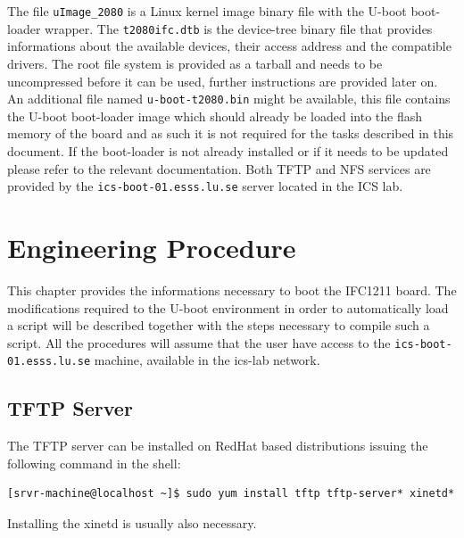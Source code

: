 \documentclass[11pt
  , a4paper
  , article
  , oneside
  , showtrims
]{memoir}
\begin{document}
The file \texttt{uImage\_2080} is a Linux kernel image binary file with the U-boot boot-loader wrapper. The \texttt{t2080ifc.dtb} is the device-tree binary file that provides informations about the available devices, their access address and the compatible drivers.
The root file system is provided as a tarball and needs to be uncompressed before it can be used, further instructions are provided later on.
An additional file named \texttt{u-boot-t2080.bin} might be available, this file contains the U-boot boot-loader image which should already be loaded into the flash memory of the board and as such it is not required for the tasks described in this document. If the boot-loader is not already installed or if it needs to be updated please refer to the relevant documentation.
Both TFTP and NFS services are provided by the \texttt{ics-boot-01.esss.lu.se} server located in the ICS lab.


\clearpage
\chapter{Engineering Procedure}

This chapter provides the informations necessary to boot the IFC1211 board. The modifications required to the U-boot environment in order to automatically load a script will be described together with the steps necessary to compile such a script.
All the procedures will assume that the user have access to the \texttt{ics-boot-01.esss.lu.se} machine, available in the ics-lab network.


\iffalse
\section{TFTP Server}
The TFTP server can be installed on RedHat based distributions issuing the following command in the shell:
\begin{lstlisting}[style=termstyle]
[srvr-machine@localhost ~]$ sudo yum install tftp tftp-server* xinetd*
\end{lstlisting}

Installing the xinetd is usually also necessary.
\end{document}
